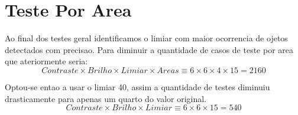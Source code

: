 	\section{Teste Por Area}
	Ao final dos testes geral identificamos o limiar com maior ocorrencia de ojetos detectados com precisao. Para diminuir a quantidade de casos de teste por area que  ateriormente seria:
	\begin{displaymath}
 Contraste \times Brilho \times Limiar \times Areas \equiv 6 \times 6 \times 4  \times 15 = 2160
\end{displaymath}

Optou-se entao a usar o limiar 40, assim a quantidade de testes diminuiu drasticamente para apenas um quarto do valor original.
	\begin{displaymath}
 Contraste \times Brilho \times Limiar \equiv 6 \times 6 \times 15 = 540
\end{displaymath}